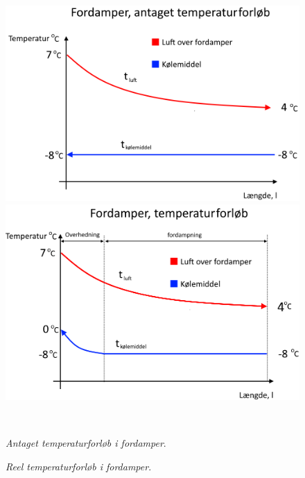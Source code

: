 \documentclass[../Hovedrapport.tex]{subfiles}
\begin{document}
\begin{figure}[H]
	\centering
	\begin{minipage}[b]{0.495\textwidth}
	\centering
	\includegraphics[width=1.00\textwidth]{Billeder/temp_fordamp.png} %
	\end{minipage}
	\hfill
	\begin{minipage}[b]{0.495\textwidth}
	\centering
	\includegraphics[width=1.00\textwidth]{Billeder/reel_tf_ny.png} %
	\end{minipage}
	\\ %
	\begin{minipage}[t]{0.45\textwidth}
	\caption{\textit{Antaget temperaturforløb i fordamper}.} %
	\label{fig:Temperaturforloeb_fordamper}
	\end{minipage}
	\hfill
	\begin{minipage}[t]{0.45\textwidth}
	\caption{\textit{Reel temperaturforløb i fordamper}.} %
	\label{fig: Reel temperaturforløb igennem fordamper med overhedning.}
	\end{minipage}
\end{figure}
\end{document}
